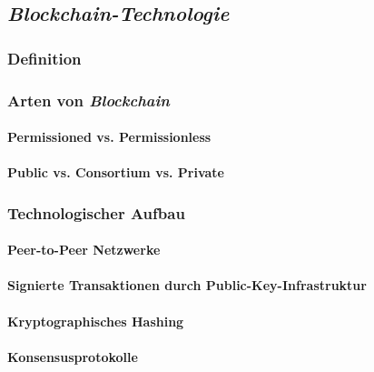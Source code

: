 \subsection{\textit{Blockchain-Technologie}}

\subsubsection{Definition}


\subsubsection{Arten von \textit{Blockchain}}


\paragraph{Permissioned vs. Permissionless}


\paragraph{Public vs. Consortium vs. Private}


\subsubsection{Technologischer Aufbau}


\paragraph{Peer-to-Peer Netzwerke}


\paragraph{Signierte Transaktionen durch Public-Key-Infrastruktur}


\paragraph{Kryptographisches Hashing}


\paragraph{Konsensusprotokolle}


